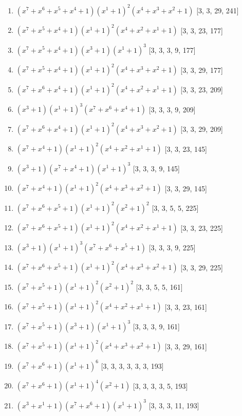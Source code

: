 \documentclass[10pt,twocolumn]{article}
\begin{document}
\begin{enumerate}
\item $(x^{7} + x^{6} + x^{5} + x^{4} + 1)(x^{1} + 1)^{2}(x^{4} + x^{3} + x^{2} + 1)$  [3, 3, 29, 241]
\item $(x^{7} + x^{5} + x^{4} + 1)(x^{1} + 1)^{2}(x^{4} + x^{2} + x^{1} + 1)$  [3, 3, 23, 177]
\item $(x^{7} + x^{5} + x^{4} + 1)(x^{3} + 1)(x^{1} + 1)^{3}$  [3, 3, 3, 9, 177]
\item $(x^{7} + x^{5} + x^{4} + 1)(x^{1} + 1)^{2}(x^{4} + x^{3} + x^{2} + 1)$  [3, 3, 29, 177]
\item $(x^{7} + x^{6} + x^{4} + 1)(x^{1} + 1)^{2}(x^{4} + x^{2} + x^{1} + 1)$  [3, 3, 23, 209]
\item $(x^{3} + 1)(x^{1} + 1)^{3}(x^{7} + x^{6} + x^{4} + 1)$  [3, 3, 3, 9, 209]
\item $(x^{7} + x^{6} + x^{4} + 1)(x^{1} + 1)^{2}(x^{4} + x^{3} + x^{2} + 1)$  [3, 3, 29, 209]
\item $(x^{7} + x^{4} + 1)(x^{1} + 1)^{2}(x^{4} + x^{2} + x^{1} + 1)$  [3, 3, 23, 145]
\item $(x^{3} + 1)(x^{7} + x^{4} + 1)(x^{1} + 1)^{3}$  [3, 3, 3, 9, 145]
\item $(x^{7} + x^{4} + 1)(x^{1} + 1)^{2}(x^{4} + x^{3} + x^{2} + 1)$  [3, 3, 29, 145]
\item $(x^{7} + x^{6} + x^{5} + 1)(x^{1} + 1)^{2}(x^{2} + 1)^{2}$  [3, 3, 5, 5, 225]
\item $(x^{7} + x^{6} + x^{5} + 1)(x^{1} + 1)^{2}(x^{4} + x^{2} + x^{1} + 1)$  [3, 3, 23, 225]
\item $(x^{3} + 1)(x^{1} + 1)^{3}(x^{7} + x^{6} + x^{5} + 1)$  [3, 3, 3, 9, 225]
\item $(x^{7} + x^{6} + x^{5} + 1)(x^{1} + 1)^{2}(x^{4} + x^{3} + x^{2} + 1)$  [3, 3, 29, 225]
\item $(x^{7} + x^{5} + 1)(x^{1} + 1)^{2}(x^{2} + 1)^{2}$  [3, 3, 5, 5, 161]
\item $(x^{7} + x^{5} + 1)(x^{1} + 1)^{2}(x^{4} + x^{2} + x^{1} + 1)$  [3, 3, 23, 161]
\item $(x^{7} + x^{5} + 1)(x^{3} + 1)(x^{1} + 1)^{3}$  [3, 3, 3, 9, 161]
\item $(x^{7} + x^{5} + 1)(x^{1} + 1)^{2}(x^{4} + x^{3} + x^{2} + 1)$  [3, 3, 29, 161]
\item $(x^{7} + x^{6} + 1)(x^{1} + 1)^{6}$  [3, 3, 3, 3, 3, 3, 193]
\item $(x^{7} + x^{6} + 1)(x^{1} + 1)^{4}(x^{2} + 1)$  [3, 3, 3, 3, 5, 193]
\item $(x^{3} + x^{1} + 1)(x^{7} + x^{6} + 1)(x^{1} + 1)^{3}$  [3, 3, 3, 11, 193]

\end{enumerate}
\end{document}
